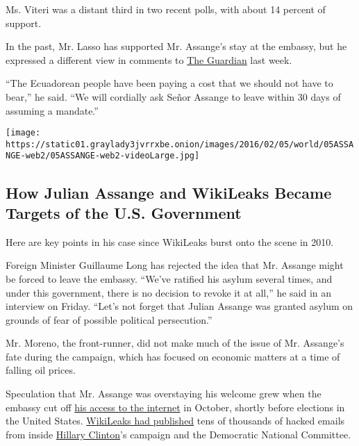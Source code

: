 Ms. Viteri was a distant third in two recent polls, with about 14
percent of support.

In the past, Mr. Lasso has supported Mr. Assange's stay at the embassy,
but he expressed a different view in comments to
\href{https://www.theguardian.com/world/2017/feb/09/ecuador-julian-assange-embassy-notice-eviction}{The
Guardian} last week.

``The Ecuadorean people have been paying a cost that we should not have
to bear,'' he said. ``We will cordially ask Señor Assange to leave
within 30 days of assuming a mandate.''

\href{https://www.nytimes3xbfgragh.onion/interactive/2019/world/julian-assange-wikileaks.html}{}

\texttt{[image: https://static01.graylady3jvrrxbe.onion/images/2016/02/05/world/05ASSANGE-web2/05ASSANGE-web2-videoLarge.jpg]}

\hypertarget{how-julian-assange-and-wikileaks-became-targets-of-the-us-government}{%
\subsection{How Julian Assange and WikiLeaks Became Targets of the U.S.
Government}\label{how-julian-assange-and-wikileaks-became-targets-of-the-us-government}}

Here are key points in his case since WikiLeaks burst onto the scene in
2010.

Foreign Minister Guillaume Long has rejected the idea that Mr. Assange
might be forced to leave the embassy. ``We've ratified his asylum
several times, and under this government, there is no decision to revoke
it at all,'' he said in an interview on Friday. ``Let's not forget that
Julian Assange was granted asylum on grounds of fear of possible
political persecution.''

Mr. Moreno, the front-runner, did not make much of the issue of Mr.
Assange's fate during the campaign, which has focused on economic
matters at a time of falling oil prices.

Speculation that Mr. Assange was overstaying his welcome grew when the
embassy cut off
\href{https://www.nytimes3xbfgragh.onion/2016/10/19/world/europe/julian-assange-embassy.html}{his
access to the internet} in October, shortly before elections in the
United States.
\href{https://www.nytimes3xbfgragh.onion/2016/11/09/us/politics/julian-assange-wikileaks-emails.html}{WikiLeaks
had published} tens of thousands of hacked emails from inside
\href{http://www.nytimes3xbfgragh.onion/topic/person/hillary-rodham-clinton?inline=nyt-per}{Hillary
Clinton}'s campaign and the Democratic National Committee.

